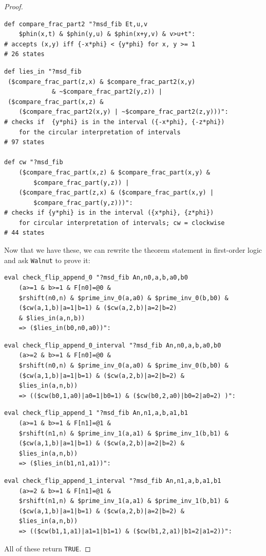 \documentclass[12pt,runningheads]{llncs}
\begin{document}
\begin{proof}
\begin{verbatim}
def compare_frac_part2 "?msd_fib Et,u,v 
    $phin(x,t) & $phin(y,u) & $phin(x+y,v) & v>u+t":
# accepts (x,y) iff {-x*phi} < {y*phi} for x, y >= 1  
# 26 states
\end{verbatim}

\begin{verbatim}
def lies_in "?msd_fib  
 ($compare_frac_part(z,x) & $compare_frac_part2(x,y) 
             & ~$compare_frac_part2(y,z)) |
 ($compare_frac_part(x,z) & 
    ($compare_frac_part2(x,y) | ~$compare_frac_part2(z,y)))":
# checks if  {y*phi} is in the interval ({-x*phi}, {-z*phi}) 
    for the circular interpretation of intervals
# 97 states

def cw "?msd_fib 
    ($compare_frac_part(x,z) & $compare_frac_part(x,y) & 
        $compare_frac_part(y,z)) |
    ($compare_frac_part(z,x) & ($compare_frac_part(x,y) |   
        $compare_frac_part(y,z)))":
# checks if {y*phi} is in the interval ({x*phi}, {z*phi}) 
    for circular interpretation of intervals; cw = clockwise
# 44 states
\end{verbatim}

Now that we have these, we can rewrite the theorem statement in first-order logic and ask {\tt Walnut} to prove it:
\begin{verbatim}
eval check_flip_append_0 "?msd_fib An,n0,a,b,a0,b0 
    (a>=1 & b>=1 & F[n0]=@0 & 
    $rshift(n0,n) & $prime_inv_0(a,a0) & $prime_inv_0(b,b0) & 
    ($cw(a,1,b)|a=1|b=1) & ($cw(a,2,b)|a=2|b=2) 
    & $lies_in(a,n,b)) 
    => ($lies_in(b0,n0,a0))":
\end{verbatim}

\begin{verbatim}
eval check_flip_append_0_interval "?msd_fib An,n0,a,b,a0,b0 
    (a>=2 & b>=1 & F[n0]=@0 & 
    $rshift(n0,n) & $prime_inv_0(a,a0) & $prime_inv_0(b,b0) & 
    ($cw(a,1,b)|a=1|b=1) & ($cw(a,2,b)|a=2|b=2) & 
    $lies_in(a,n,b)) 
    => (($cw(b0,1,a0)|a0=1|b0=1) & ($cw(b0,2,a0)|b0=2|a0=2) )":
\end{verbatim}

\begin{verbatim}
eval check_flip_append_1 "?msd_fib An,n1,a,b,a1,b1 
    (a>=1 & b>=1 & F[n1]=@1 & 
    $rshift(n1,n) & $prime_inv_1(a,a1) & $prime_inv_1(b,b1) & 
    ($cw(a,1,b)|a=1|b=1) & ($cw(a,2,b)|a=2|b=2) & 
    $lies_in(a,n,b)) 
    => ($lies_in(b1,n1,a1))":
\end{verbatim}

\begin{verbatim}
eval check_flip_append_1_interval "?msd_fib An,n1,a,b,a1,b1 
    (a>=2 & b>=1 & F[n1]=@1 & 
    $rshift(n1,n) & $prime_inv_1(a,a1) & $prime_inv_1(b,b1) & 
    ($cw(a,1,b)|a=1|b=1) & ($cw(a,2,b)|a=2|b=2) & 
    $lies_in(a,n,b)) 
    => (($cw(b1,1,a1)|a1=1|b1=1) & ($cw(b1,2,a1)|b1=2|a1=2))":
\end{verbatim}
All of these return {\tt TRUE}.
\end{proof}
\end{document}
